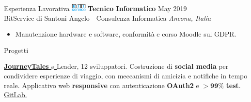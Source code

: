 \documentclass{cv} %
\begin{document}
\begin{minipage}[b][0.9\paperheight][t]{0.7\linewidth}
\begin{rSection}{Esperienza Lavorativa}
        \includegraphics[width=0.75cm, trim={0cm 1.5cm 0cm 0cm}]{bitservice-icon.png}
        \textbf{Tecnico Informatico} \hfill May 2019 \\
        \hspace*{0.85cm}BitService di Santoni Angelo - Consulenza Informatica
        \hfill \textit{Ancona, Italia}
        \begin{itemize}
            \item Manutenzione hardware e software, conformità e corso Moodle sul GDPR.
        \end{itemize}
    \end{rSection}

    \begin{rSection}{Progetti}
        \item \textbf{\href{https://pufferfish.sa4.usi.ch/login}
            {
                JourneyTales
                \includegraphics[width=0.15cm, trim={10cm -10cm 0cm 0cm}]{ext-link-icon.png}
            }}
        {Leader, 12 sviluppatori.
            Costruzione di \textbf{social media} per condividere esperienze di viaggio,
            con meccanismi di amicizia e notifiche in tempo reale.
            Applicativo web \textbf{responsive} con autenticazione \textbf{OAuth2} e
            $\boldsymbol{> 99\%}$ \textbf{test}.
            \href{https://gitlab.com/usi-si-oss/teaching/projects-showcase/sa4/team-4-pufferfish}{GitLab.}
        }


\end{rSection}
\end{minipage}
\end{document}
